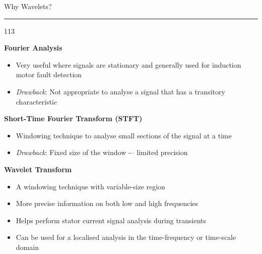 \documentclass[10pt]{beamer}
\begin{document}
\begin{slide*}
{\large \textsf{Why Wavelets?}}\\
\hrule
\vspace{10pt}
\begin{dinglist} {113}
\item \textbf{Fourier Analysis}
    \begin{itemize}
    \item Very useful where signals are stationary and generally used for induction motor fault detection
    \item \emph{Drawback}: Not appropriate to analyse a signal that has a transitory characteristic
    \end{itemize}
\item \textbf{Short-Time Fourier Transform (STFT)} 
    \begin{itemize}
    \item Windowing technique to analyse small sections of the signal at a time
    \item \emph{Drawback}: Fixed size of the window -– limited precision
    \end{itemize}
\item \textbf{Wavelet Transform}
    \begin{itemize}
    \item A windowing technique with variable-size region
    \item More precise information on both low and high frequencies
    \item Helps perform stator current signal analysis during transients
    \item Can be used for a localised analysis in the time-frequency or time-scale domain
    \end{itemize}
\end{dinglist}
\end{slide*}
\end{document}
